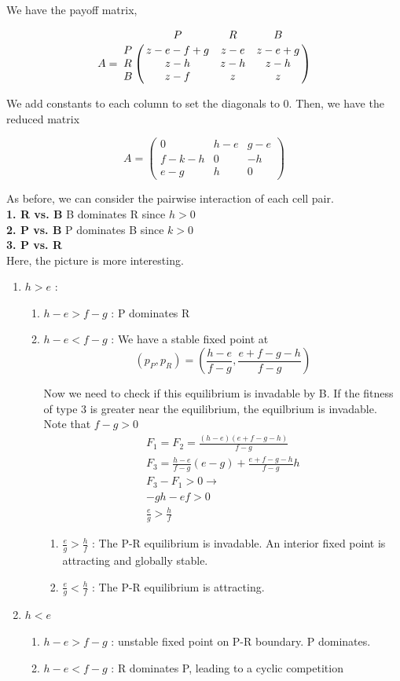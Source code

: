 \documentclass[12pt]{report}
\begin{document}
We have the payoff matrix, 

$$A = \bordermatrix{\text{}& P & R & B\cr
                P & z - e - f + g & z - e & z - e + g \cr
                R & z - h  &  z - h & z - h \cr
                B & z - f & z & z \cr
               }$$

We add constants to each column to set the diagonals to 0.  Then, we have the reduced matrix


$$ A = \begin{pmatrix}
0 & h - e& g - e \\
f - k - h & 0 & -h \\
e - g& h & 0
\end{pmatrix} $$

As before, we can consider the pairwise interaction of each cell pair. \\

\textbf{1. R vs. B} B dominates R since $h > 0$ \\

\textbf{2. P vs. B} P dominates B since $k > 0$ \\

\textbf{3. P vs. R} \\
Here, the picture is more interesting. 
\begin{enumerate}
	\item $h > e$ : 
	\begin{enumerate}
		\item $h - e > f - g$ : P dominates R
		\item $h - e < f - g$ : We have a stable fixed point at 
		$$(p_P, p_R) = (\frac{h - e}{f-g}, \frac{e + f - g- h}{f -g})$$ 
		
		 Now we need to check if this equilibrium is invadable by B. If the fitness of type 3 is greater near the equilibrium, the equilbrium is invadable. Note that $f - g > 0$
		\begin{gather*}
		F_1 = F_2 = \frac{(h - e)(e + f  - g - h)}{f - g} \\
		F_3 = \frac{h- e}{f-g} (e - g) + \frac{e + f - g - h}{f - g} h \\
		F_3 - F_1 > 0 \rightarrow \\
		- g h - ef > 0 \\
		\frac{e}{g} > \frac{h}{f}
		\end{gather*}
		
		\begin{enumerate}
			\item $\frac{e}{g} > \frac{h}{f}$ : The P-R equilibrium is invadable. An interior fixed point is attracting and globally stable.
			\item  $\frac{e}{g} < \frac{h}{f}$ : The P-R equilibrium is attracting.
		\end{enumerate}
	\end{enumerate}
	\item $h < e$
	\begin{enumerate}
		\item $h - e > f -g$  : unstable fixed point on P-R boundary. P dominates.
		\item $h - e < f - g$ : R dominates P, leading to a cyclic competition
	\end{enumerate}
\end{enumerate}
\end{document}
